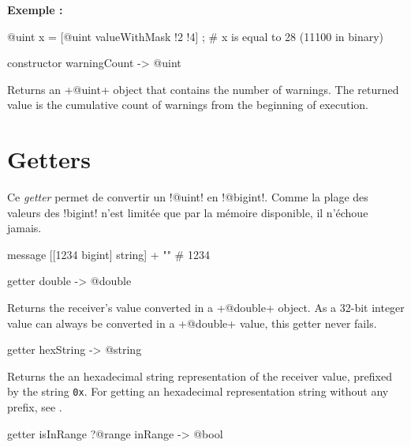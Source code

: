 \textbf{Exemple :}
\begin{galgas}
@uint x = [@uint valueWithMask !2 !4] ; # x is equal to 28 (11100 in binary)
\end{galgas}





\begin{galgas}
constructor warningCount -> @uint
\end{galgas}


Returns an \ggs+@uint+ object that contains the number of warnings. The returned value is the cumulative count of warnings from the beginning of execution.

\section{Getters}


Ce \emph{getter} permet de convertir un \ggs!@uint! en \ggs!@bigint!. Comme la plage des valeurs des \ggs!bigint! n'est limitée que par la mémoire disponible, il n'échoue jamais.

\begin{galgas}
  message [[1234 bigint] string] + "\n" # 1234
\end{galgas}



\begin{galgas}
getter double -> @double
\end{galgas}

Returns the receiver's value converted in a \ggs+@double+ object. As a 32-bit integer value can always be converted in a \ggs+@double+ value, this getter never fails.




\begin{galgas}
getter hexString -> @string
\end{galgas}

Returns the an hexadecimal string representation of the receiver value, prefixed by the string \texttt{0x}. For getting an hexadecimal representation string without any prefix, see .




\begin{galgas}
getter isInRange ?@range inRange -> @bool
\end{galgas}

